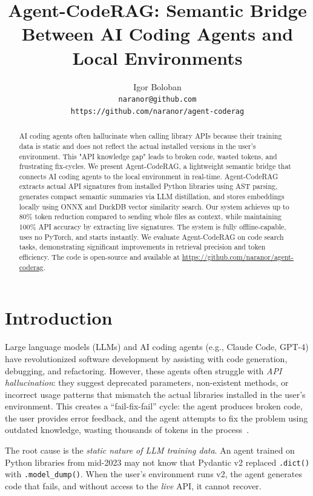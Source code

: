 \documentclass[10pt,twocolumn]{article}
\title{Agent-CodeRAG: Semantic Bridge Between AI Coding Agents and Local Environments}
\author{Igor Boloban \\
\small \texttt{naranor@github.com} \\
\small \texttt{https://github.com/naranor/agent-coderag}
}
\begin{document}
\maketitle

\begin{abstract}
AI coding agents often hallucinate when calling library APIs because their training data is static and does not reflect the actual installed versions in the user's environment. This "API knowledge gap" leads to broken code, wasted tokens, and frustrating fix-cycles. We present Agent-CodeRAG, a lightweight semantic bridge that connects AI coding agents to the local environment in real-time. Agent-CodeRAG extracts actual API signatures from installed Python libraries using AST parsing, generates compact semantic summaries via LLM distillation, and stores embeddings locally using ONNX and DuckDB vector similarity search. Our system achieves up to 80\% token reduction compared to sending whole files as context, while maintaining 100\% API accuracy by extracting live signatures. The system is fully offline-capable, uses no PyTorch, and starts instantly. We evaluate Agent-CodeRAG on code search tasks, demonstrating significant improvements in retrieval precision and token efficiency. The code is open-source and available at \url{https://github.com/naranor/agent-coderag}.
\end{abstract}

\section{Introduction}
\label{sec:intro}

Large language models (LLMs) and AI coding agents (e.g., Claude Code, GPT-4) have revolutionized software development by assisting with code generation, debugging, and refactoring. However, these agents often struggle with \textit{API hallucination}: they suggest deprecated parameters, non-existent methods, or incorrect usage patterns that mismatch the actual libraries installed in the user's environment. This creates a ``fail-fix-fail'' cycle: the agent produces broken code, the user provides error feedback, and the agent attempts to fix the problem using outdated knowledge, wasting thousands of tokens in the process~\citep{barke2023grounded}.

The root cause is the \textit{static nature of LLM training data}. An agent trained on Python libraries from mid-2023 may not know that Pydantic v2 replaced \texttt{.dict()} with \texttt{.model\_dump()}. When the user's environment runs v2, the agent generates code that fails, and without access to the \textit{live} API, it cannot recover.
\end{document}
